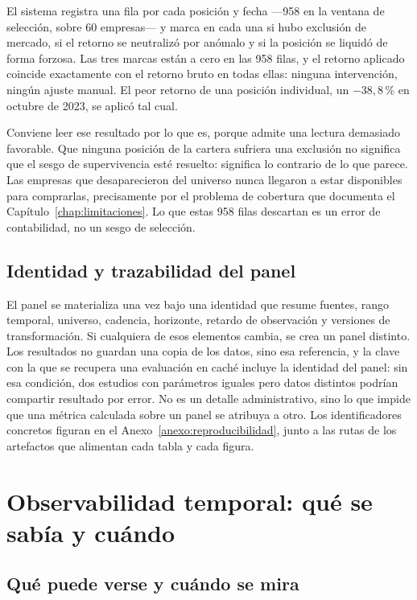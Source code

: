 El sistema registra una fila por cada posición y fecha ---958 en la ventana de selección, sobre 60
empresas--- y marca en cada una si hubo exclusión de mercado, si el retorno se neutralizó por
anómalo y si la posición se liquidó de forma forzosa. Las tres marcas están a cero en las 958
filas, y el retorno aplicado coincide exactamente con el retorno bruto en todas ellas: ninguna
intervención, ningún ajuste manual. El peor retorno de una posición individual, un $-38{,}8$\,\% en
octubre de 2023, se aplicó tal cual.

Conviene leer ese resultado por lo que es, porque admite una lectura demasiado favorable. Que ninguna
posición de la cartera sufriera una exclusión no significa que el sesgo de supervivencia esté
resuelto: significa lo contrario de lo que parece. Las empresas que desaparecieron del universo
nunca llegaron a estar disponibles para comprarlas, precisamente por el problema de cobertura que
documenta el Capítulo~\ref{chap:limitaciones}. Lo que estas 958 filas descartan es un error de
contabilidad, no un sesgo de selección.

\subsection{Identidad y trazabilidad del panel}

El panel se materializa una vez bajo una identidad que resume fuentes, rango temporal, universo,
cadencia, horizonte, retardo de observación y versiones de transformación. Si cualquiera de esos
elementos cambia, se crea un panel distinto. Los resultados no guardan una copia de los datos, sino
esa referencia, y la clave con la que se recupera una evaluación en caché incluye la identidad del
panel: sin esa condición, dos estudios con parámetros iguales pero datos distintos podrían compartir
resultado por error. No es un detalle administrativo, sino lo que impide que una métrica calculada
sobre un panel se atribuya a otro. Los identificadores concretos figuran en el
Anexo~\ref{anexo:reproducibilidad}, junto a las rutas de los artefactos que alimentan cada tabla y
cada figura.

\section{Observabilidad temporal: qué se sabía y cuándo}
\label{sec:observabilidad}

\subsection{Qué puede verse y cuándo se mira}

